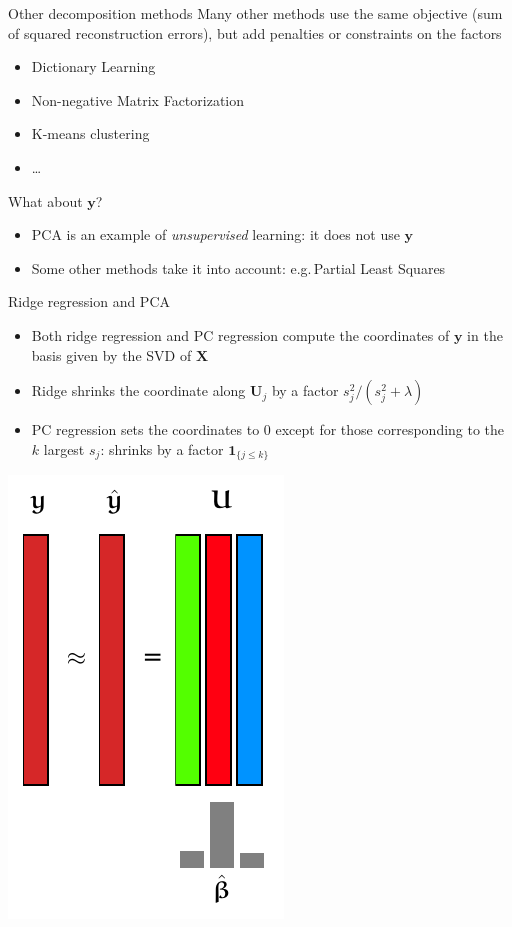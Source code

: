 \documentclass[presentation,mathserif,table]{beamer}
\newcommand{\eg}{e.g.\,}
\newcommand{\X}{{\mathbold X}}
\newcommand{\y}{{\mathbold y}}
\newcommand{\U}{{\mathbold U}}
\begin{document}
\begin{frame}[label={sec:org7e5d826}]{Other decomposition methods}
Many other methods use the same objective (sum of squared reconstruction errors), but add penalties or constraints on the factors
\begin{itemize}
\item Dictionary Learning
\item Non-negative Matrix Factorization
\item K-means clustering
\item \ldots{}
\end{itemize}

\begin{block}{What about \(\y\)?}
\begin{itemize}
\item PCA is an example of \emph{unsupervised} learning: it does not use \(\y\)
\item Some other methods take it into account: \eg Partial Least Squares
\end{itemize}
\end{block}
\end{frame}
\begin{frame}[label={sec:org31ad6a0}]{Ridge regression and PCA}
\begin{itemize}
\item Both ridge regression and PC regression compute the coordinates of \(\y\) in the basis given by the SVD of \(\X\)
\item Ridge shrinks the coordinate along \(\U_j\) by a factor \(s_j^2 / (s_j^2 + \lambda)\)
\item PC regression sets the coordinates to 0 except for those corresponding to the \(k\) largest \(s_j\): shrinks by a factor \(\mathbold{1}_{\{j \leq k\}}\)
\end{itemize}

\begin{center}
\includegraphics[height=.6\textheight]{figures/generated/dim_reduction_colors/regression_reduced_3_svd.pdf}
\end{center}
\end{frame}
\end{document}
